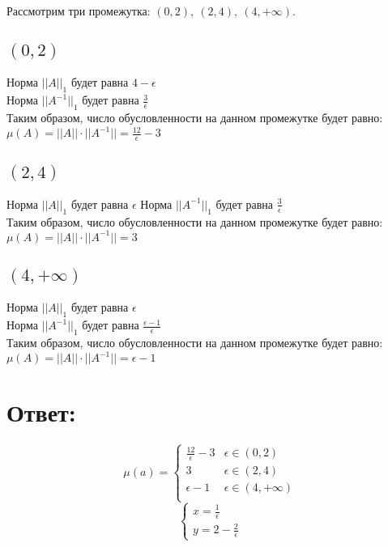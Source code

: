 \documentclass[12pt]{article}
\begin{document}
Рассмотрим три промежутка: $(0,2), \ (2,4), \ (4,+\infty)$. \\
\subsection{$(0,2)$}
Норма $||A||_1$ будет равна $4-\epsilon$\\
Норма $||A^{-1}||_1$ будет равна $\frac{3}{\epsilon}$\\
Таким образом, число обусловленности на данном промежутке будет равно: $\mu(A) = ||A||\cdot ||A^{-1}|| = \frac{12}{\epsilon} - 3$
\subsection{$(2,4)$}
Норма $||A||_1$ будет равна $\epsilon$
Норма $||A^{-1}||_1$ будет равна $\frac{3}{\epsilon}$\\
Таким образом, число обусловленности на данном промежутке будет равно: $\mu(A) = ||A||\cdot ||A^{-1}|| = 3$
\subsection{$(4,+\infty)$}
Норма $||A||_1$ будет равна $\epsilon$\\
Норма $||A^{-1}||_1$ будет равна $\frac{\epsilon-1}{\epsilon}$\\
Таким образом, число обусловленности на данном промежутке будет равно: $\mu(A) = ||A||\cdot ||A^{-1}|| =\epsilon - 1$

\section{Ответ:}
\[\mu(a) = \begin{cases}
	\frac{12}{\epsilon} -3 & \epsilon \in (0, 2)\\
	3 &  \epsilon \in (2, 4)\\
	\epsilon - 1  & \epsilon \in (4, +\infty)\\
\end{cases}\]
\[\begin{cases}
	x = \frac{1}{\epsilon}\\
	y = 2-\frac{2}{\epsilon}
\end{cases}\]
\end{document}
